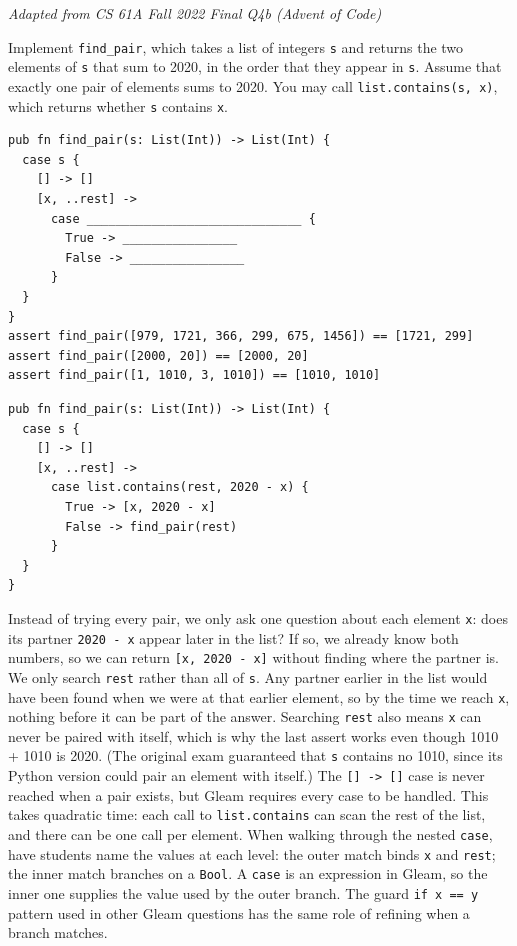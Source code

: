 
\begin{blocksection}
\question \textit{Adapted from CS 61A Fall 2022 Final Q4b (Advent of Code)}

Implement \texttt{find\_pair}, which takes a list of integers \texttt{s} and returns the two elements of \texttt{s} that sum to 2020, in the order that they appear in \texttt{s}. Assume that exactly one pair of elements sums to 2020. You may call \lstinline{list.contains(s, x)}, which returns whether \texttt{s} contains \texttt{x}.
\begin{lstlisting}
pub fn find_pair(s: List(Int)) -> List(Int) {
  case s {
    [] -> []
    [x, ..rest] ->
      case ______________________________ {
        True -> ________________
        False -> ________________
      }
  }
}
assert find_pair([979, 1721, 366, 299, 675, 1456]) == [1721, 299]
assert find_pair([2000, 20]) == [2000, 20]
assert find_pair([1, 1010, 3, 1010]) == [1010, 1010]
\end{lstlisting}
\begin{solution}
\begin{lstlisting}
pub fn find_pair(s: List(Int)) -> List(Int) {
  case s {
    [] -> []
    [x, ..rest] ->
      case list.contains(rest, 2020 - x) {
        True -> [x, 2020 - x]
        False -> find_pair(rest)
      }
  }
}
\end{lstlisting}
\end{solution}
\begin{questionmeta}
  Instead of trying every pair, we only ask one question about each element \texttt{x}: does its partner \lstinline{2020 - x} appear later in the list? If so, we already know both numbers, so we can return \lstinline{[x, 2020 - x]} without finding where the partner is.
  We only search \texttt{rest} rather than all of \texttt{s}. Any partner earlier in the list would have been found when we were at that earlier element, so by the time we reach \texttt{x}, nothing before it can be part of the answer. Searching \texttt{rest} also means \texttt{x} can never be paired with itself, which is why the last assert works even though 1010 + 1010 is 2020. (The original exam guaranteed that \texttt{s} contains no 1010, since its Python version could pair an element with itself.)
  The \lstinline{[] -> []} case is never reached when a pair exists, but Gleam requires every case to be handled.
  This takes quadratic time: each call to \lstinline{list.contains} can scan the rest of the list, and there can be one call per element.
  When walking through the nested \lstinline{case}, have students name the values at each level: the outer match binds \texttt{x} and \texttt{rest}; the inner match branches on a \lstinline{Bool}. A \lstinline{case} is an expression in Gleam, so the inner one supplies the value used by the outer branch. The guard \lstinline{if x == y} pattern used in other Gleam questions has the same role of refining when a branch matches.
\end{questionmeta}
\end{blocksection}
